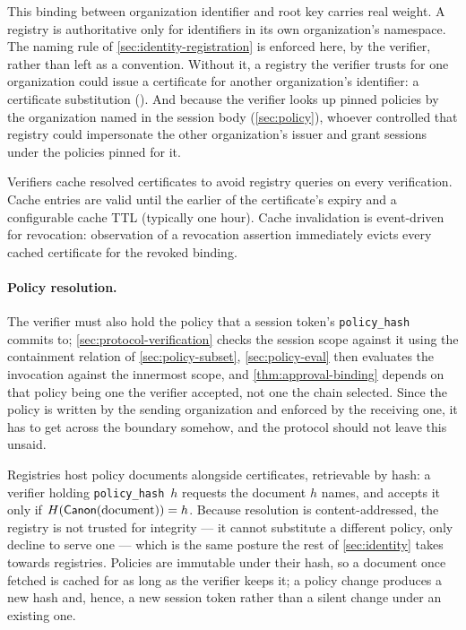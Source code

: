 \documentclass[11pt,a4paper]{article}
\begin{document}
This binding between organization identifier and root key carries real
weight. A registry is authoritative only for identifiers in its own
organization's namespace. The naming rule of
\cref{sec:identity-registration} is enforced here, by the verifier,
rather than left as a convention. Without it, a registry the verifier
trusts for one organization could issue a certificate for another
organization's identifier: a certificate substitution
(). And because the verifier looks up pinned policies by
the organization named in the session body (\cref{sec:policy}), whoever
controlled that registry could impersonate the other organization's
issuer and grant sessions under the policies pinned for it.

Verifiers cache resolved certificates to avoid registry queries on
every verification. Cache entries are valid until the earlier of the
certificate's expiry and a configurable cache TTL (typically one
hour). Cache invalidation is event-driven for revocation: observation
of a revocation assertion immediately evicts every cached certificate
for the revoked binding.

\paragraph{Policy resolution.}
The verifier must also hold the policy that a session token's
\texttt{policy\_hash} commits to; \cref{sec:protocol-verification} checks the
session scope against it using the containment relation of
\cref{sec:policy-subset}, \cref{sec:policy-eval} then evaluates the
invocation against the innermost scope, and
\cref{thm:approval-binding} depends on that policy being one the
verifier accepted, not one the chain selected. Since the policy is written by the sending
organization and enforced by the receiving one, it has to get across the
boundary somehow, and the protocol should not leave this unsaid.

Registries host policy documents alongside certificates, retrievable by
hash: a verifier holding \texttt{policy\_hash}~$h$ requests the document
$h$ names, and accepts it only if $H(\mathsf{Canon}(\text{document})) = h$.
Because resolution is content-addressed, the registry is not trusted
for integrity --- it cannot substitute a different policy, only decline
to serve one --- which is the same posture the rest of
\cref{sec:identity} takes towards registries. Policies are immutable
under their hash, so a document once fetched is cached for as long as
the verifier keeps it; a policy change produces a new hash and, hence, a
new session token rather than a silent change under an existing one.
\end{document}
